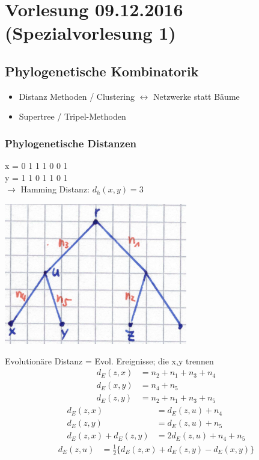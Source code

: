\section{Vorlesung 09.12.2016 (Spezialvorlesung 1)}
\subsection{Phylogenetische Kombinatorik}
		
\begin{itemize}
	\item Distanz Methoden / Clustering $\leftrightarrow$ Netzwerke statt Bäume 
	\item Supertree / Tripel-Methoden
\end{itemize}
\subsubsection{Phylogenetische Distanzen}

x = \color{red}0 \color{green}1 \color{red}1 \color{green}1 \color{red}0 \color{green}0 1\\\color{black}
y = \color{red}1 \color{green}1 \color{red}0 \color{green}1 \color{red}1 \color{green}0 1\\
\color{black}$\rightarrow$ Hamming Distanz: $d_h(x,y) = 3$

\begin{center}
	\includegraphics[scale=0.7]{lectures/161209/pix/evol_distanz}
\end{center}

Evolutionäre Distanz = Evol. Ereignisse; die x,y trennen	
\begin{align*}
	d_E (z,x) &= n_2 + n_1 + n_3 + n_4\\
	d_E (x,y) &= n_4 + n_5\\
	d_E (z,y) &= n_2 + n_1 + n_3 + n_5
\end{align*}
\begin{align*}
	d_E (z,x) &= d_E (z,u) + n_4\\
	d_E (z,y) &= d_E (z,u) + n_5\\
	d_E (z,x) + d_E (z,y) &= 2 d_E(z,u) + n_4 + n_5
\end{align*}
\begin{align*}
	d_E (z,u) &= \frac{1}{2} \lbrace d_E (z,x) + d_E (z,y) - d_E (x,y) \rbrace
\end{align*}

